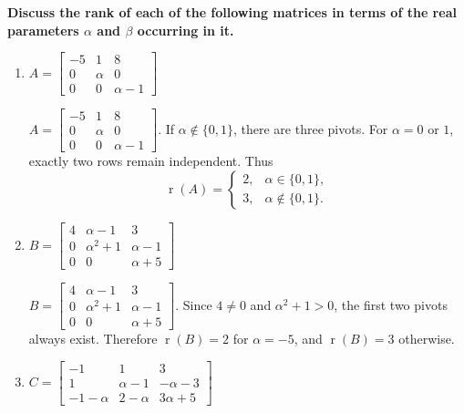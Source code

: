 \providecommand{\rank}{\operatorname{r}}
\providecommand{\RR}{\mathbb R}
\providecommand{\CC}{\mathbb C}
\providecommand{\KK}{\mathbb K}

\setcounter{enumi}{18}
\item {\bfseries\boldmath
Discuss the rank of each of the following matrices in terms of the real parameters $\alpha$ and $\beta$ occurring in it.
}

\begin{enumerate}[label=\alph*)]

\item $A=\begin{bmatrix}-5&1&8\\0&\alpha&0\\0&0&\alpha-1\end{bmatrix}$

\begin{answer}
$A=\begin{bmatrix}-5&1&8\\0&\alpha&0\\0&0&\alpha-1\end{bmatrix}$.
If $\alpha\notin\{0,1\}$, there are three pivots. For $\alpha=0$ or $1$,
exactly two rows remain independent. Thus
\[
 \rank(A)=\begin{cases}2,&\alpha\in\{0,1\},\\3,&\alpha\notin\{0,1\}.\end{cases}
\]
\end{answer}

\item $B=\begin{bmatrix}4&\alpha-1&3\\0&\alpha^2+1&\alpha-1\\0&0&\alpha+5\end{bmatrix}$

\begin{answer}
$B=\begin{bmatrix}4&\alpha-1&3\\0&\alpha^2+1&\alpha-1\\0&0&\alpha+5\end{bmatrix}$.
Since $4\ne0$ and $\alpha^2+1>0$, the first two pivots always exist.
Therefore $\rank(B)=2$ for $\alpha=-5$, and $\rank(B)=3$ otherwise.
\end{answer}

\item $C=\begin{bmatrix}-1&1&3\\1&\alpha-1&-\alpha-3\\-1-\alpha&2-\alpha&3\alpha+5\end{bmatrix}$


\end{enumerate}
